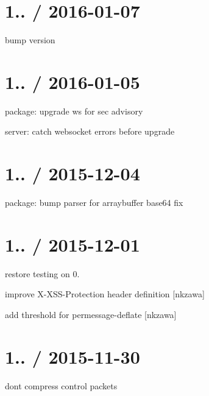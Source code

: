 \section*{1.. / 2016-\/01-\/07 }


\begin{DoxyItemize}
\item bump version
\end{DoxyItemize}

\section*{1.. / 2016-\/01-\/05 }


\begin{DoxyItemize}
\item package\+: upgrade ws for sec advisory
\item server\+: catch websocket errors before upgrade
\end{DoxyItemize}

\section*{1.. / 2015-\/12-\/04 }


\begin{DoxyItemize}
\item package\+: bump parser for arraybuffer base64 fix
\end{DoxyItemize}

\section*{1.. / 2015-\/12-\/01 }


\begin{DoxyItemize}
\item restore testing on 0.
\item improve X-\/\+X\+S\+S-\/\+Protection header definition \mbox{[}nkzawa\mbox{]}
\item add threshold for permessage-\/deflate \mbox{[}nkzawa\mbox{]}
\end{DoxyItemize}

\section*{1.. / 2015-\/11-\/30 }


\begin{DoxyItemize}
\item don\textquotesingle{}t compress control packets
\end{DoxyItemize}

